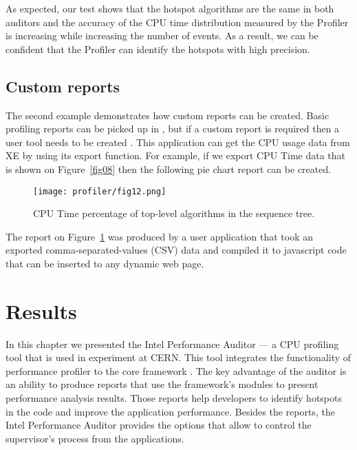 As expected, our test shows that the hotspot algorithms are the same in both
auditors and the accuracy of the CPU time distribution measured by the Profiler
is increasing while increasing the number of events. As a result, we can be
confident that the Profiler can identify the hotspots with high precision.

\subsection{Custom reports}

The second example demonstrates how custom reports can be created. Basic
profiling reports can be picked up in
\amp, but if a custom report is required then a user tool needs to be created .
This application can get the CPU usage data from \iamp XE by using
its export function. For example, if we export CPU Time data that is shown on
Figure~\ref{fig08} then the following pie chart report can be created.

\begin{figure}[H]
\begin{minipage}{\textwidth}
\begin{center}
\texttt{[image: profiler/fig12.png]}
\caption{\label{fig12}CPU Time percentage of top-level algorithms in the \gaudi sequence tree.}
\end{center}
\end{minipage}
\end{figure}

The report on Figure~\ref{fig12} was produced by a user application that took
an exported  comma-separated-values (CSV) data and compiled it to javascript
code that can be inserted to any dynamic web page.

\section{Results}
In this chapter we presented the \gaudi Intel Performance Auditor --- a CPU
profiling tool that is used in \lhcb experiment at CERN. This tool integrates
the functionality of \iamp performance profiler to the \lhcb core framework
\gaudi. The key advantage of the auditor is an ability to produce reports that
use the framework's modules to present performance analysis results. Those
reports help  developers to identify hotspots in the code and improve the
application performance. Besides the reports, the \gaudi Intel Performance
Auditor provides the options that allow to control the \iamp supervisor's
process from the \gaudi applications.

